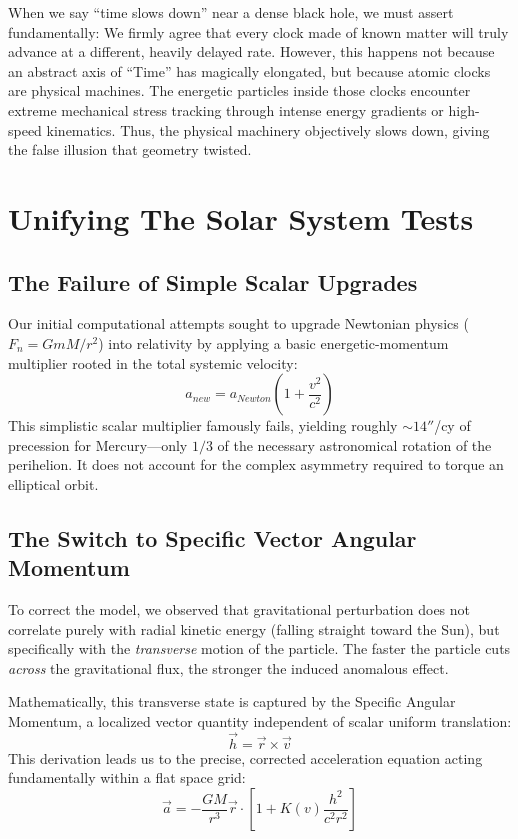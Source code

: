 \documentclass[reprint,amsmath,amssymb,aps,prd,twocolumn]{revtex4-2}
\begin{document}
When we say ``time slows down'' near a dense black hole, we must assert fundamentally: We firmly agree that every clock made of known matter will truly advance at a different, heavily delayed rate. However, this happens not because an abstract axis of ``Time'' has magically elongated, but because atomic clocks are physical machines. The energetic particles inside those clocks encounter extreme mechanical stress tracking through intense energy gradients or high-speed kinematics. Thus, the physical machinery objectively slows down, giving the false illusion that geometry twisted.

\section{Unifying The Solar System Tests}

\subsection{The Failure of Simple Scalar Upgrades}

Our initial computational attempts sought to upgrade Newtonian physics ($F_{n} = GmM/r^2$) into relativity by applying a basic energetic-momentum multiplier rooted in the total systemic velocity:
\begin{equation}
a_{new} = a_{Newton} \left( 1 + \frac{v^2}{c^2} \right)
\end{equation}
This simplistic scalar multiplier famously fails, yielding roughly $\sim 14''$/cy of precession for Mercury---only $1/3$ of the necessary astronomical rotation of the perihelion. It does not account for the complex asymmetry required to torque an elliptical orbit.

\subsection{The Switch to Specific Vector Angular Momentum}

To correct the model, we observed that gravitational perturbation does not correlate purely with radial kinetic energy (falling straight toward the Sun), but specifically with the \emph{transverse} motion of the particle. The faster the particle cuts \emph{across} the gravitational flux, the stronger the induced anomalous effect.

Mathematically, this transverse state is captured by the Specific Angular Momentum, a localized vector quantity independent of scalar uniform translation:
\begin{equation}
\vec{h} = \vec{r} \times \vec{v}
\end{equation}
This derivation leads us to the precise, corrected acceleration equation acting fundamentally within a flat space grid:
\begin{equation}
\vec{a} = -\frac{GM}{r^3}\vec{r} \cdot \left[ 1 + K(v) \frac{h^2}{c^2 r^2} \right]
\end{equation}
\end{document}
